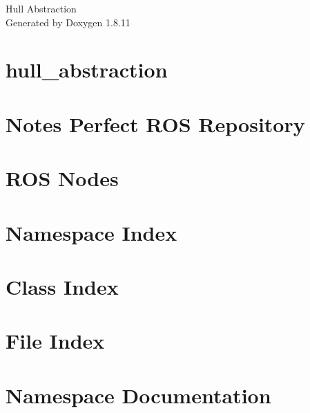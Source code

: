 \documentclass[twoside]{book}
\newcommand{\+}{\discretionary{\mbox{\scriptsize$\hookleftarrow$}}{}{}}
\newcommand{\clearemptydoublepage}{%
  \newpage{\pagestyle{empty}\cleardoublepage}%
}
\begin{document}
\hypersetup{pageanchor=false,
             bookmarksnumbered=true,
             pdfencoding=unicode
            }
\begin{titlepage}
\vspace*{7cm}
\begin{center}%
{\Large Hull Abstraction }\\
\vspace*{1cm}
{\large Generated by Doxygen 1.8.11}\\
\end{center}
\end{titlepage}
\clearemptydoublepage
\tableofcontents
\clearemptydoublepage
{}
\hypersetup{pageanchor=true}

\chapter{hull\+\_\+abstraction}
\label{index}\hypertarget{index}{}
\chapter{Notes Perfect R\+OS Repository}
\label{md__home_jc_hull_abstraction_NOTES}
\hypertarget{md__home_jc_hull_abstraction_NOTES}{}

\chapter{R\+OS Nodes}
\label{ros_node}
\hypertarget{ros_node}{}

\chapter{Namespace Index}

\chapter{Class Index}

\chapter{File Index}

\chapter{Namespace Documentation}












\end{document}

